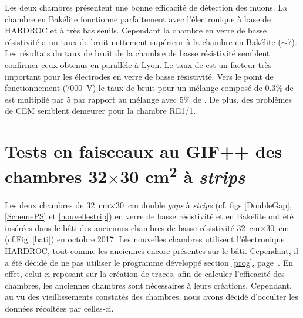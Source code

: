 Les deux chambres présentent une bonne efficacité de détection des muons. La chambre en Bakélite fonctionne parfaitement avec l'électronique à base de HARDROC et à très bas seuils. Cependant la chambre en verre de basse résistivité a un taux de bruit nettement supérieur à la chambre en Bakélite ($\sim$\num{7}). Les résultats du taux de bruit de la chambre de basse résistivité semblent confirmer ceux obtenus en parallèle à Lyon. Le taux de  est un facteur très important pour les électrodes en verre de basse résistivité. Vers le point de fonctionnement (\SI{7000}{\volt}) le taux de bruit pour un mélange composé de \num{0.3}\% de  est multiplié par \num{5} par rapport au mélange avec \num{5}\% de . De plus, des problèmes de CEM semblent demeurer pour la chambre RE1/1.


\section{Tests en faisceaux au GIF++ des chambres \texorpdfstring{\num{32}$\times$\num{30} \si{\square\centi\meter}}{32cm x 30cm} à \textit{strips}}
\label{GIFF4}
\label{smallchamber}

Les deux chambres de \SI{32}{\centi\meter}$\times$\SI{30}{\centi\meter} double \textit{gaps} à \textit{strips} (cf. figs \ref{DoubleGap}, \ref{SchemePS} et \ref{nouvellestrip}) en verre de basse résistivité et en Bakélite ont été insérées dans le bâti des anciennes chambres de basse résistivité \SI{32}{\centi\meter}$\times$\SI{30}{\centi\meter} (cf.Fig~\ref{bati}) en octobre 2017. Les nouvelles chambres utilisent l'électronique HARDROC, tout comme les anciennes encore présentes sur le bâti. Cependant, il a été décidé de ne pas utiliser le programme développé section \ref{prog}, page~\pageref{prog}. En effet, celui-ci reposant sur la création de traces, afin de calculer l'efficacité des chambres, les anciennes chambres sont nécessaires à leurs créations. Cependant, au vu des vieillissements constatés des chambres, nous avons décidé d'occulter les données récoltées par celles-ci.

